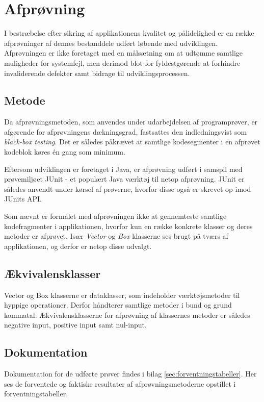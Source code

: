 \section{Afprøvning}
\label{sec:afproevning}
I bestræbelse efter sikring af applikationens kvalitet og pålidelighed er en række afprøvninger af dennes bestanddele udført løbende med udviklingen. Afprøvningen er ikke foretaget med en målsætning om at udtømme samtlige muligheder for systemfejl, men derimod blot for fyldestgørende at forhindre invaliderende defekter samt bidrage til udviklingsprocessen.

\subsection{Metode}
\label{subsec:metode}
Da afprøvningsmetoden, som anvendes under udarbejdelsen af programprøver, er afgørende for afprøvningens dækningsgrad, fastsattes den indledningsvist som \emph{black-box testing}. Det er således påkrævet at samtlige kodesegmenter i en afprøvet kodeblok køres én gang som minimum.

Eftersom udviklingen er foretaget i Java, er afprøvning udført i samspil med prøvemiljøet JUnit - et populært Java værktøj til netop afprøvning. JUnit er således anvendt under kørsel af prøverne, hvorfor disse også er skrevet op imod JUnits API.

Som nævnt er formålet med afprøvningen ikke at gennemteste samtlige kodefragmenter i applikationen, hvorfor kun en række konkrete klasser og deres metoder er afprøvet. Især \emph{Vector} og \emph{Box} klasserne ses brugt på tværs af applikationen, og derfor er netop disse udvalgt.

\subsection{Ækvivalensklasser}
\label{subsec:aekvivalensklasser}
Vector og Box klasserne er dataklasser, som indeholder værktøjsmetoder til hyppige operationer. Derfor håndterer samtlige metoder i bund og grund kommatal. Ækvivalensklasserne for afprøvning af klassernes metoder er således negative input, positive input samt nul-input.

\subsection{Dokumentation}
\label{subsec:dokumentation}
Dokumentation for de udførte prøver findes i bilag \ref{sec:forventningstabeller}. Her ses de forventede og faktiske resultater af afprøvningsmetoderne opstillet i forventningstabeller.